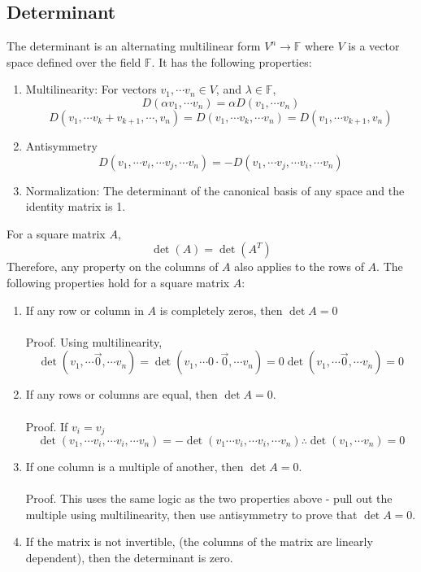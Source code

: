 \documentclass{article}
\newcommand{\0}{\mathbf{0}} %
\begin{document}
\subsection*{Determinant}
The determinant is an alternating multilinear form $V^n \to \mathbb F$ where $V$ is a vector space defined over the field 
$\mathbb F$. It has the following properties: 
\begin{enumerate}
    \item Multilinearity: 
    For vectors $v_1, \cdots v_n \in V$, and $\lambda \in \mathbb F$, 
    $$D( \alpha v_1, \cdots v_n) = \alpha D(v_1, \cdots v_n)$$ 
    $$D(v_1, \cdots v_k + v_{k+1}, \cdots, v_n) = D(v_1, \cdots v_k, \cdots v_n) = D(v_1, \cdots v_{k+1}, v_n)$$ 
    \item Antisymmetry
    $$D(v_1, \cdots v_i,\cdots v_j, \cdots v_n) = -D(v_1, \cdots v_j, \cdots v_i, \cdots v_n)$$
    \item Normalization: The determinant of the canonical basis of any space and the identity matrix is 1.
\end{enumerate}
For a square matrix $A$, 
$$\det(A) = \det(A^T)$$ 
Therefore, any property on the columns of $A$ also applies to the rows of $A$.
The following properties hold for a square matrix $A$: 
\begin{enumerate}
    \item If any row or column in $A$ is completely zeros, then $\det A = 0$ \\\\
    Proof. Using multilinearity, 
    $$\det(v_1, \cdots \vec 0, \cdots v_n) = \det(v_1, \cdots 0 \cdot \vec 0, \cdots v_n) = 0 \det(v_1, \cdots \vec 0, \cdots v_n) = 0$$ 
    \item 
    If any rows or columns are equal, then $\det A = 0$. \\\\ 
    Proof. If $v_i = v_j$
    $$\det(v_1, \cdots v_i, \cdots v_i, \cdots v_n) = -\det(v_1 \cdots v_i, \cdots v_i, \cdots v_n) \therefore \det(v_1, \cdots v_n) = 0$$
    \item
    If one column is a multiple of another, then $\det A = 0$. \\\\ 
    Proof. This uses the same logic as the two properties above - pull out the multiple using multilinearity, then use antisymmetry to prove that $\det A = 0$.
    \item 
    If the matrix is not invertible, (the columns of the matrix are linearly dependent), then the 
    determinant is zero. 
\end{enumerate}
\end{document}
